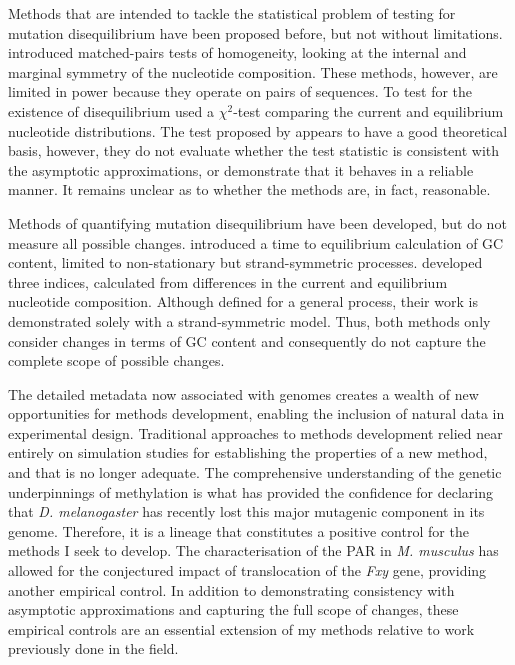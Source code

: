 Methods that are intended to tackle the statistical problem of testing for mutation disequilibrium have been proposed before, but not without limitations. \cite{Ababneh2006Matched-pairsSequences} introduced matched-pairs tests of homogeneity, looking at the internal and marginal symmetry of the nucleotide composition. These methods, however, are limited in power because they operate on pairs of sequences. To test for the existence of disequilibrium \cite{Squartini2008QuantifyingProcess} used a $\chi^2$-test comparing the current and equilibrium nucleotide distributions. The test proposed by \cite{Squartini2008QuantifyingProcess} appears to have a good theoretical basis, however, they do not evaluate whether the test statistic is consistent with the asymptotic approximations, or demonstrate that it behaves in a reliable manner. It remains unclear as to whether the methods are, in fact, reasonable. 

Methods of quantifying mutation disequilibrium have been developed, but do not measure all possible changes. \cite{Singh2009StrongDrosophila} introduced a time to equilibrium calculation of GC content, limited to non-stationary but strand-symmetric processes. \cite{Squartini2008QuantifyingProcess} developed three indices, calculated from differences in the current and equilibrium nucleotide composition. Although defined for a general process, their work is demonstrated solely with a strand-symmetric model. Thus, both methods only consider changes in terms of GC content and consequently do not capture the complete scope of possible changes.

The detailed metadata now associated with genomes creates a wealth of new opportunities for methods development, enabling the inclusion of natural data in experimental design. Traditional approaches to methods development relied near entirely on simulation studies for establishing the properties of a new method, and that is no longer adequate. The comprehensive understanding of the genetic underpinnings of methylation is what has provided the confidence for declaring that \textit{D. melanogaster} has recently lost this major mutagenic component in its genome. Therefore, it is a lineage that constitutes a positive control for the methods I seek to develop. The characterisation of the PAR in \textit{M. musculus} has allowed for the conjectured impact of translocation of the \textit{Fxy} gene, providing another empirical control. In addition to demonstrating consistency with asymptotic approximations and capturing the full scope of changes, these empirical controls are an essential extension of my methods relative to work previously done in the field. 

